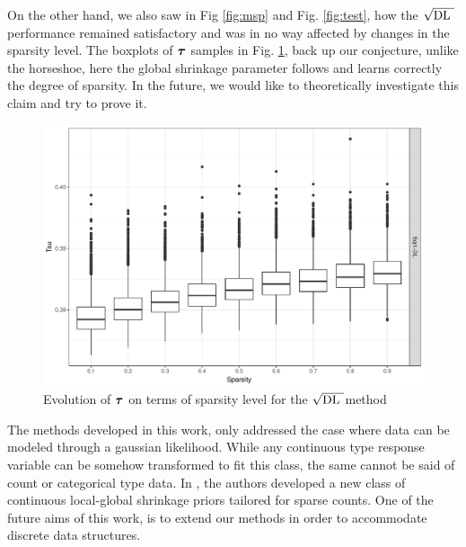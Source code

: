 \documentclass[chapters]{uamaththesis}
\def\sqdl{$\sqrt{\text{\rm{DL} }}$}
\begin{document}
On the other hand, we also saw in Fig \ref{fig:msp} and Fig. \ref{fig:test}, how the \sqdl performance remained satisfactory and was in no way affected by changes in the sparsity level. The boxplots of $\boldsymbol{\tau}$ samples in Fig. \ref{fig:tau-dl}, back up our conjecture, unlike the horseshoe, here the global shrinkage parameter follows and learns correctly the degree of sparsity. In the future, we would like to theoretically investigate this claim and try to prove it.


\begin{figure}
\centering
\includegraphics[scale = .6]{Tau_dl}\caption{Evolution of $\boldsymbol{\tau}$ on terms of sparsity level for the \sqdl method}\label{fig:tau-dl}
\end{figure}

The methods developed in this work, only addressed the case where data can be modeled through a gaussian likelihood. While any continuous type response variable can be somehow transformed to fit this class, the same cannot be said of count or categorical type data. In \citep{datta2016bayesian}, the authors developed a new class of continuous local-global shrinkage priors tailored for
sparse counts. One of the future aims of this work, is to extend our methods in order to accommodate discrete data structures. 

\end{document}
